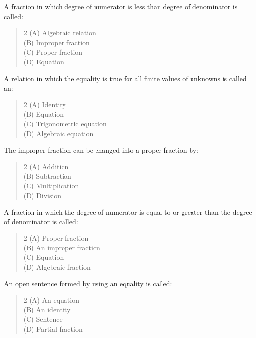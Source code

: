 \documentclass[11pt,a4paper]{article}
\begin{document}
\begin{mcqlist}
\item A fraction in which degree of numerator is less than degree of denominator is called:
\begin{quote}\begin{multicols}{2}
\noindent (A) Algebraic relation \\
(B) Improper fraction \\
(C) Proper fraction \\
(D) Equation
\end{multicols}\end{quote}

\item A relation in which the equality is true for all finite values of unknowns is called an:
\begin{quote}\begin{multicols}{2}
\noindent (A) Identity \\
(B) Equation \\
(C) Trigonometric equation \\
(D) Algebraic equation
\end{multicols}\end{quote}

\item The improper fraction can be changed into a proper fraction by:
\begin{quote}\begin{multicols}{2}
\noindent (A) Addition \\
(B) Subtraction \\
(C) Multiplication \\
(D) Division
\end{multicols}\end{quote}

\item A fraction in which the degree of numerator is equal to or greater than the degree of denominator is called:
\begin{quote}\begin{multicols}{2}
\noindent (A) Proper fraction \\
(B) An improper fraction \\
(C) Equation \\
(D) Algebraic fraction
\end{multicols}\end{quote}

\item An open sentence formed by using an equality is called:
\begin{quote}\begin{multicols}{2}
\noindent (A) An equation \\
(B) An identity \\
(C) Sentence \\
(D) Partial fraction
\end{multicols}\end{quote}


\end{mcqlist}
\end{document}
